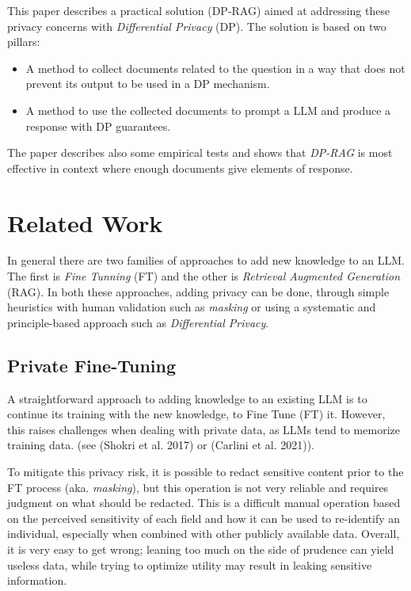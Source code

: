 \documentclass[
  12pt,
  a4paper,
]{article}
\providecommand{\tightlist}{%
  \setlength{\itemsep}{0pt}\setlength{\parskip}{0pt}}
\begin{document}
This paper describes a practical solution (DP-RAG) aimed at addressing
these privacy concerns with \emph{Differential Privacy} (DP). The
solution is based on two pillars:

\begin{itemize}
\tightlist
\item
  A method to collect documents related to the question in a way that
  does not prevent its output to be used in a DP mechanism.
\item
  A method to use the collected documents to prompt a LLM and produce a
  response with DP guarantees.
\end{itemize}

The paper describes also some empirical tests and shows that
\emph{DP-RAG} is most effective in context where enough documents give
elements of response.

\section{Related Work}\label{related-work}

In general there are two families of approaches to add new knowledge to
an LLM. The first is \emph{Fine Tunning} (FT) and the other is
\emph{Retrieval Augmented Generation} (RAG). In both these approaches,
adding privacy can be done, through simple heuristics with human
validation such as \emph{masking} or using a systematic and
principle-based approach such as \emph{Differential Privacy}.

\subsection{Private Fine-Tuning}\label{private-fine-tuning}

A straightforward approach to adding knowledge to an existing LLM is to
continue its training with the new knowledge, to Fine Tune (FT) it.
However, this raises challenges when dealing with private data, as LLMs
tend to memorize training data. (see (Shokri et al. 2017) or (Carlini et
al. 2021)).

To mitigate this privacy risk, it is possible to redact sensitive
content prior to the FT process (aka. \emph{masking}), but this
operation is not very reliable and requires judgment on what should be
redacted. This is a difficult manual operation based on the perceived
sensitivity of each field and how it can be used to re-identify an
individual, especially when combined with other publicly available data.
Overall, it is very easy to get wrong; leaning too much on the side of
prudence can yield useless data, while trying to optimize utility may
result in leaking sensitive information.
\end{document}
